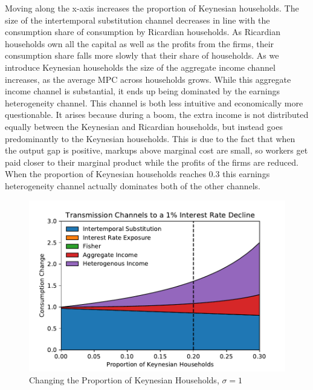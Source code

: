 \documentclass[titlepage]{\econtex}\newcommand{\texname}{ConsumptionHeterogeneity}
\begin{document}
Moving along the x-axis increases the proportion of Keynesian households. The size of the intertemporal substitution channel decreases in line with the consumption share of consumption by Ricardian households. As Ricardian households own all the capital as well as the profits from the firms, their consumption share falls more slowly that their share of households. As we introduce Keynesian households the size of the aggregate income channel increases, as the average MPC across households grows. While this aggregate income channel is substantial, it ends up being dominated by the earnings heterogeneity channel. This channel is both less intuitive and economically more questionable. It arises because during a boom, the extra income is not distributed equally between the Keynesian and Ricardian households, but instead goes predominantly to the Keynesian households. This is due to the fact that when the output gap is positive, markups above marginal cost are small, so workers get paid closer to their marginal product while the profits of the firms are reduced. When the proportion of Keynesian households reaches 0.3 this earnings heterogeneity channel actually dominates both of the other channels.

\begin{figure} 
	\begin{centering}
		\includegraphics[scale=0.7]{../Python/DoloCode/Figures/ProportionKeynesian_sigma1.pdf}
		\caption{Changing the Proportion of Keynesian Households, $\sigma=1$}
		\label{fig:ProportionKeynesian}
	\end{centering}
\end{figure}
\end{document}
